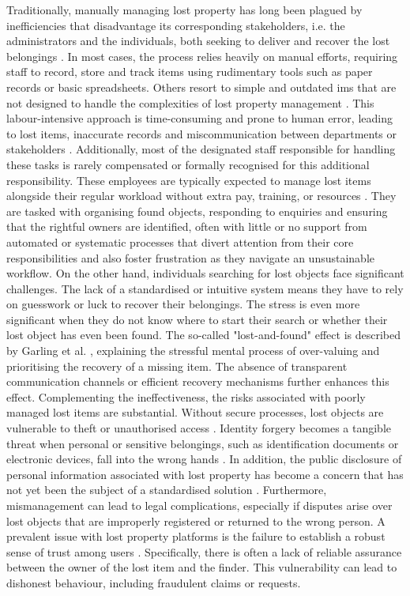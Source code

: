Traditionally, manually managing lost property has long been plagued by inefficiencies that disadvantage its corresponding stakeholders, i.e. the administrators and the individuals, both seeking to deliver and recover the lost belongings \cite{Sinha2024}.
In most cases, the process relies heavily on manual efforts, requiring staff to record, store and track items using rudimentary tools such as paper records or basic spreadsheets.
Others resort to simple and outdated \ac{ims} that are not designed to handle the complexities of lost property management \cite{Guinard2008}.
This labour-intensive approach is time-consuming and prone to human error, leading to lost items, inaccurate records and miscommunication between departments or stakeholders \cite{Sinha2024, Guinard2008}.
Additionally, most of the designated staff responsible for handling these tasks is rarely compensated or formally recognised for this additional responsibility.
These employees are typically expected to manage lost items alongside their regular workload without extra pay, training, or resources \cite{Guinard2008}.
They are tasked with organising found objects, responding to enquiries and ensuring that the rightful owners are identified, often with little or no support from automated or systematic processes that divert attention from their core responsibilities and also foster frustration as they navigate an unsustainable workflow.
On the other hand, individuals searching for lost objects face significant challenges.
The lack of a standardised or intuitive system means they have to rely on guesswork or luck to recover their belongings.
The stress is even more significant when they do not know where to start their search or whether their lost object has even been found.
The so-called "lost-and-found" effect is described by Garling et al.
\cite{Garling2023}, explaining the stressful mental process of over-valuing and prioritising the recovery of a missing item.
The absence of transparent communication channels \cite{Guinard2008} or efficient recovery mechanisms further enhances this effect.
Complementing the ineffectiveness, the risks associated with poorly managed lost items are substantial.
Without secure processes, lost objects are vulnerable to theft or unauthorised access \cite{Tan2023}.
Identity forgery becomes a tangible threat when personal or sensitive belongings, such as identification documents or electronic devices, fall into the wrong hands \cite{Xue2022}.
In addition, the public disclosure of personal information associated with lost property has become a concern that has not yet been the subject of a standardised solution \cite{Xue2022}.
Furthermore, mismanagement can lead to legal complications, especially if disputes arise over lost objects that are improperly registered or returned to the wrong person.
A prevalent issue with lost property platforms is the failure to establish a robust sense of trust among users \cite{Xue2022}.
Specifically, there is often a lack of reliable assurance between the owner of the lost item and the finder.
This vulnerability can lead to dishonest behaviour, including fraudulent claims or requests.

